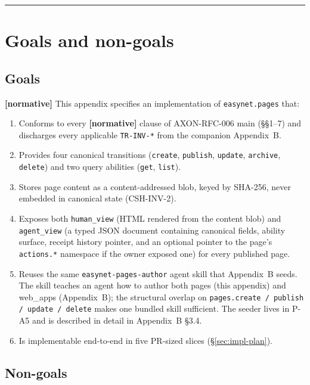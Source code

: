 \documentclass[11pt,a4paper]{article}
\newcommand{\normsv}{\textcolor{normativecolor}{\textbf{[normative]}}\xspace}
\theoremstyle{definition}
\begin{document}
\tableofcontents
\vspace{1em}
\hrule
\vspace{1em}

\section{Goals and non-goals}
\label{sec:goals}

\subsection{Goals}

\normsv{} This appendix specifies an implementation of
\texttt{easynet.pages} that:

\begin{enumerate}[leftmargin=2.2em,itemsep=0.25em]
    \item Conforms to every \normsv{} clause of AXON-RFC-006
    main (\S\S1--7) and discharges every applicable
    \texttt{TR-INV-*} from the companion Appendix~B.
    \item Provides four canonical transitions (\texttt{create},
    \texttt{publish}, \texttt{update}, \texttt{archive},
    \texttt{delete}) and two query abilities (\texttt{get},
    \texttt{list}).
    \item Stores page content as a content-addressed blob,
    keyed by SHA-256, never embedded in canonical state
    (CSH-INV-2).
    \item Exposes both \texttt{human\_view} (HTML rendered from
    the content blob) and \texttt{agent\_view} (a typed JSON
    document containing canonical fields, ability surface,
    receipt history pointer, and an optional pointer to the
    page's \texttt{actions.*} namespace if the owner exposed one)
    for every published page.
    \item Reuses the same \texttt{easynet-pages-author} agent
    skill that Appendix~B seeds. The skill teaches an agent how
    to author both pages (this appendix) and web\_apps
    (Appendix~B); the structural overlap on
    \texttt{pages.create / publish / update / delete} makes one
    bundled skill sufficient. The seeder lives in P-A5 and is
    described in detail in Appendix~B \S3.4.
    \item Is implementable end-to-end in five PR-sized slices
    (\S\ref{sec:impl-plan}).
\end{enumerate}

\subsection{Non-goals}
\end{document}
